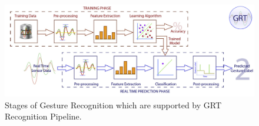\begin{figure}
	[h] \hspace{-5 mm} 
	\includegraphics[width=160mm]{figures/content/grt-pipeline.jpg} \caption{Stages of Gesture Recognition which are supported by GRT Recognition Pipeline. \cite{16} } \label{fg:grt:pipeline} 
\end{figure}
